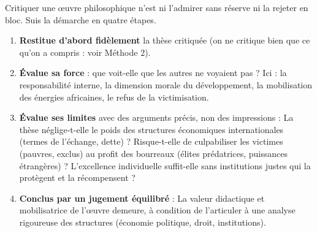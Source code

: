 \documentclass[11pt]{article}
\begin{document}
\begin{methode}
Critiquer une œuvre philosophique n'est ni l'admirer sans réserve ni la rejeter en bloc. Suis la démarche en quatre étapes.
\begin{enumerate}
\item \textbf{Restitue d'abord fidèlement} la thèse critiquée (on ne critique bien que ce qu'on a compris : voir Méthode 2).
\item \textbf{Évalue sa force} : que voit-elle que les autres ne voyaient pas ? Ici : la responsabilité interne, la dimension morale du développement, la mobilisation des énergies africaines, le refus de la victimisation.
\item \textbf{Évalue ses limites} avec des arguments précis, non des impressions : La thèse néglige-t-elle le poids des structures économiques internationales (termes de l'échange, dette) ? Risque-t-elle de culpabiliser les victimes (pauvres, exclus) au profit des bourreaux (élites prédatrices, puissances étrangères) ? L'excellence individuelle suffit-elle sans institutions justes qui la protègent et la récompensent ?
\item \textbf{Conclus par un jugement équilibré} : La valeur didactique et mobilisatrice de l'œuvre demeure, à condition de l'articuler à une analyse rigoureuse des structures (économie politique, droit, institutions).
\end{enumerate}
\end{methode}
\end{document}
